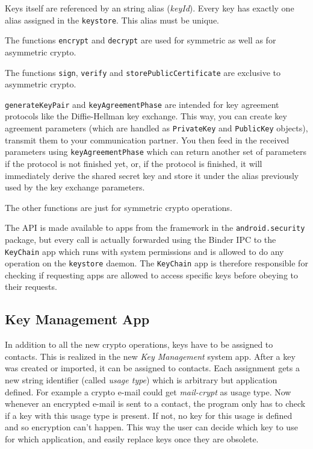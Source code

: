\documentclass[a4paper]{scrartcl}
\begin{document}
		Keys itself are referenced by an string alias (\emph{keyId}). Every key has exactly one alias assigned in the \texttt{keystore}. This alias must be unique.
	
		The functions \texttt{encrypt} and \texttt{decrypt} are used for symmetric as well as for asymmetric crypto.

		The functions \texttt{sign}, \texttt{verify} and \texttt{storePublicCertificate} are exclusive to asymmetric crypto.

		\texttt{generateKeyPair} and \texttt{keyAgreementPhase} are intended for key agreement protocols like the Diffie-Hellman key exchange. This way, you can create key agreement parameters (which are handled as \texttt{PrivateKey} and \texttt{PublicKey} objects), transmit them to your communication partner. You then feed in the received parameters using \texttt{keyAgreementPhase} which can return another set of parameters if the protocol is not finished yet, or, if the protocol is finished, it will immediately derive the shared secret key and store it under the alias previously used by the key exchange parameters.

		The other functions are just for symmetric crypto operations.

		The API is made available to apps from the framework in the \texttt{android.security} package, but every call
		is actually forwarded using the Binder IPC to the \texttt{KeyChain} app which runs with system permissions and
		is allowed to do any operation on the \texttt{keystore} daemon. The \texttt{KeyChain} app is therefore responsible
		for checking if requesting apps are allowed to access specific keys before obeying to their requests.
	
	\subsection{Key Management App}
		In addition to all the new crypto operations, keys have to be assigned to contacts. This is realized in the new {\em Key Management} system app. After a key was created or imported, it can be assigned to contacts. Each assignment gets a new string identifier (called {\em usage type}) which is arbitrary but application defined. For example a crypto e-mail could get \textit{mail-crypt} as usage type. Now whenever an encrypted e-mail is sent to a contact, the program only has to check if a key with this usage type is present. If not, no key for this usage is defined and so encryption can't happen. This way the user can decide which key to use for which application, and easily replace keys once they are obsolete.
		
\end{document}
